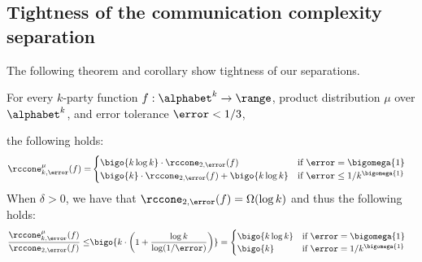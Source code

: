 \subsection{Tightness of the communication complexity separation}

The following theorem and corollary show tightness of our separations.



\begin{theorem}\label{theorem:logk-tight}
For every $k$-party function $f: \alphabet^k\to \range$, product distribution $\mu$ over $\alphabet^k$, and error tolerance $\error <1/3$, 

the following holds:
\begin{align*}
\rccone_{k,\error}^{\mu}(f) =& \begin{cases}
	\bigo{k\log k}	 \cdot  \rccone_{2,\error}(f) & \mbox{if $\error={\bigomega{1}}$}\\
	\bigo{k}	 \cdot  \rccone_{2,\error}(f)+\bigo{k\log k}	& \mbox{if $\error \le 1/k^{\bigomega{1}} $}
\end{cases}  
\end{align*}
When $\delta > 0$, we have that $\rccone_{2,\error}(f) = \Omega(\log k)$ and thus the following holds:
\begin{align*}
\frac{{\rccone_{k,\error}^{\mu}(f)}} {{\rccone_{2,\error}(f)}} \le & 
\bigo{k \cdot \left(1+\frac{\log k}{\log(1/\error)}\right) }
= \begin{cases}
	\bigo{k\log k}	  & \mbox{if $\error={\bigomega{1}}$}\\
	\bigo{k}		& \mbox{if $\error=1/k^{\bigomega{1}}$}
	\end{cases}
\end{align*}


\end{theorem}

